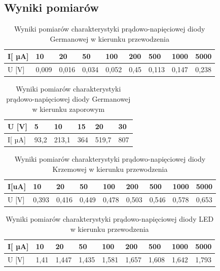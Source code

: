 \documentclass[10.5pt]{article}
\begin{document}
\subsection*{Wyniki pomiarów}
\begin{table}[!ht]
    \centering
    \caption{Wyniki pomiarów charakterystyki prądowo-napięciowej diody Germanowej w kierunku przewodzenia}
    \begin{tabular}{|l|l|l|l|l|l|l|l|l|}
    \hline
        I[ µA] & 10 & 20 & 50 & 100 & 200 & 500 & 1000 & 5000 \\ \hline
        U [V] & 0,009 & 0,016 & 0,034 & 0,052 & 0,45 & 0,113 & 0,147 & 0,238 \\ \hline
    \end{tabular}
\end{table}
\begin{table}[!ht]
    \centering
    \caption{Wyniki pomiarów charakterystyki prądowo-napięciowej diody Germanowej w kierunku zaporowym}
    \begin{tabular}{|l|l|l|l|l|l|}
    \hline
        U [V] & 5 & 10 & 15 & 20 & 30 \\ \hline
        I[ µA] & 93,2 & 213,1 & 364 & 519,7 & 807 \\ \hline
    \end{tabular}
\end{table}
\begin{table}[!ht]
    \centering
    \caption{Wyniki pomiarów charakterystyki prądowo-napięciowej diody Krzemowej w kierunku przewodzenia}
    \begin{tabular}{|l|l|l|l|l|l|l|l|l|}
    \hline
        I[uA] & 10 & 20 & 50 & 100 & 200 & 500 & 1000 & 5000 \\ \hline
        U [V] & 0,393 & 0,416 & 0,449 & 0,478 & 0,503 & 0,546 & 0,578 & 0,653 \\ \hline
    \end{tabular}
\end{table}
\begin{table}[!ht]
    \centering
    \caption{Wyniki pomiarów charakterystyki prądowo-napięciowej diody LED w kierunku przewodzenia}
    \begin{tabular}{|l|l|l|l|l|l|l|l|l|}
    \hline
        I[ µA] & 10 & 20 & 50 & 100 & 200 & 500 & 1000 & 5000 \\ \hline
        U [V] & 1,41 & 1,447 & 1,435 & 1,581 & 1,657 & 1,608 & 1,642 & 1,793 \\ \hline
    \end{tabular}
\end{table}
\end{document}

